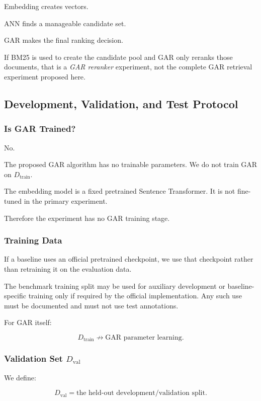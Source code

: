 \documentclass[11pt,a4paper]{article}
\begin{document}
Embedding creates vectors.

ANN finds a manageable candidate set.

GAR makes the final ranking decision.

If BM25 is used to create the candidate pool and GAR only reranks those documents, that is a \emph{GAR reranker} experiment, not the complete GAR retrieval experiment proposed here.

\subsection{Development, Validation, and Test Protocol}

\subsubsection{Is GAR Trained?}

No.

The proposed GAR algorithm has no trainable parameters. We do not train GAR on $D_{\mathrm{train}}$.

The embedding model is a fixed pretrained Sentence Transformer. It is not fine-tuned in the primary experiment.

Therefore the experiment has no GAR training stage.

\subsubsection{Training Data}

If a baseline uses an official pretrained checkpoint, we use that checkpoint rather than retraining it on the evaluation data.

The benchmark training split may be used for auxiliary development or baseline-specific training only if required by the official implementation. Any such use must be documented and must not use test annotations.

For GAR itself:

\[
D_{\mathrm{train}}
\not\rightarrow
\text{GAR parameter learning}.
\]

\subsubsection{Validation Set $D_{\mathrm{val}}$}

We define:

\[
\boxed{D_{\mathrm{val}}=\text{the held-out development/validation split}.}
\]
\end{document}
